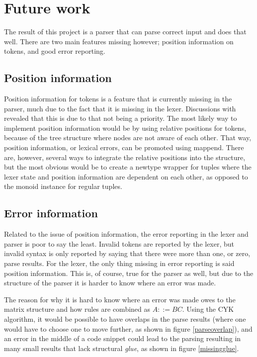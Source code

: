 \documentclass[a4paper,12pt,twosided]{report}
\begin{document}
\section{Future work}
\label{futurework}
The result of this project is a parser that can parse correct input and does
that well. There are two main features missing however; position information on
tokens, and good error reporting.

\subsection{Position information}
Position information for tokens is a feature that is currently missing in the
parser, much due to the fact that it is missing in the lexer. Discussions with
\citeauthor{divconqlex} revealed that this is due to that not being a priority.
The most likely way to implement position information would be by using relative
positions for tokens, because of the tree structure where nodes are not aware of
each other. That way, position information, or lexical errors, can be promoted
using mappend. There are, however, several ways to integrate the relative
positions into the structure, but the most obvious would be to create a newtype
wrapper for tuples where the lexer state and position information are dependent
on each other, as opposed to the monoid instance for regular tuples. 

\subsection{Error information}
Related to the issue of position information, the error reporting in the lexer
and parser is poor to say the least. Invalid tokens are reported by the lexer,
but invalid syntax is only reported by saying that there were more than one, or
zero, parse results. For the lexer, the only thing missing in error reporting is
said position information. This is, of course, true for the parser as well, but
due to the structure of the parser it is harder to know where an error was made.

The reason for why it is hard to know where an error was made owes to the matrix
structure and how rules are combined as $A ::= BC$. Using the CYK algorithm, it
would be possible to have overlaps in the parse results (where one would have to
choose one to move further, as shown in figure \ref{parseoverlap}), and an error
in the middle of a code snippet could lead to the parsing resulting in many
small results that lack structural \textit{glue}, as shown in figure
\ref{missingglue}. 
\end{document}
